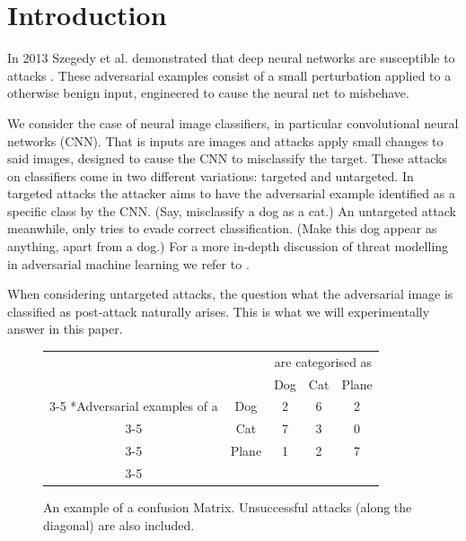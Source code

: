 \documentclass{article}
\begin{document}
\section{Introduction}



In 2013 Szegedy et al. demonstrated that deep neural networks are susceptible to attacks \cite{Szegedy13}. These adversarial examples consist of a small perturbation applied to a otherwise benign input, engineered to cause the neural net to misbehave.

We consider the case of neural image classifiers, in particular convolutional neural networks \cite{lecun1999object} (CNN).
That is inputs are images and attacks apply small changes to said images, designed to cause the CNN to misclassify the target. These attacks on classifiers come in two different variations: targeted and untargeted.
In targeted attacks the attacker aims to have the adversarial example identified as a specific class by the CNN. (Say, misclassify a dog as a cat.)
An untargeted attack meanwhile, only tries to evade correct classification. (Make this dog appear as anything, apart from a dog.)
For a more in-depth discussion of threat modelling in adversarial machine learning we refer to \cite{biggio2018wild}.

When considering untargeted attacks, the question what the adversarial image is classified as post-attack naturally arises. This is what we will experimentally answer in this paper.

\begin{figure}[h]
	\begin{tabular}{cc|c|c|c|}
		& \multicolumn{1}{c}{} & \multicolumn{3}{c}{are categorised as}\\
		& \multicolumn{1}{c}{} & \multicolumn{1}{c}{Dog}  & \multicolumn{1}{c}{Cat} & \multicolumn{1}{c}{Plane} \\\cline{3-5}
		\multirow{3}*{Adversarial examples of a}  & Dog & 2 & 6 & 2\\\cline{3-5}
		& Cat & 7 & 3 &  0 \\\cline{3-5}
		& Plane & 1 & 2 &  7 \\\cline{3-5}
	\end{tabular}

	\caption{An example of a confusion Matrix. Unsuccessful attacks (along the diagonal) are also included.}
	\label{fig:matrixexample}
\end{figure}
\end{document}
